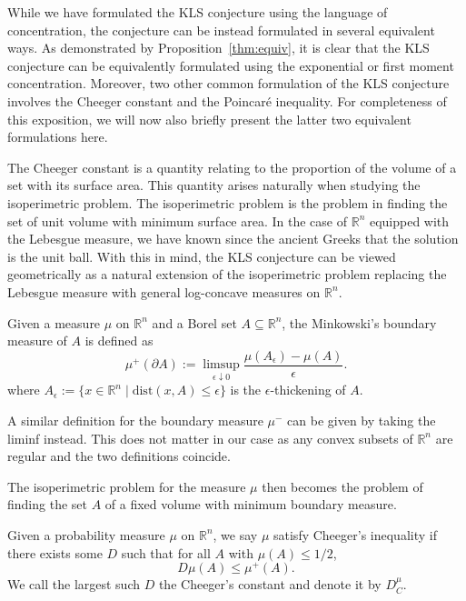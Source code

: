 While we have formulated the KLS conjecture using the language of concentration, the conjecture can be  
instead formulated in several equivalent ways. As demonstrated by Proposition~\ref{thm:equiv}, it is clear 
that the KLS conjecture can be equivalently formulated using the exponential or first moment concentration. 
Moreover, two other common formulation of the KLS conjecture involves the Cheeger constant and the Poincaré 
inequality. For completeness of this exposition, we will now also briefly present the latter two equivalent 
formulations here. 

The Cheeger constant is a quantity relating to the proportion of the volume of a set with its surface area.
This quantity arises naturally when studying the isoperimetric problem. The isoperimetric problem is the problem 
in finding the set of unit volume with minimum surface area. In the case of \(\mathbb{R}^n\) equipped with the 
Lebesgue measure, we have known since the ancient Greeks that the solution is the unit ball. 
With this in mind, the KLS conjecture can be viewed geometrically as a natural extension of the isoperimetric problem 
replacing the Lebesgue measure with general log-concave measures on \(\mathbb{R}^n\).

\begin{definition}
  Given a measure \(\mu\) on \(\mathbb{R}^n\) and a Borel set \(A \subseteq \mathbb{R}^n\), the Minkowski's 
  boundary measure of \(A\) is defined as
  \[\mu^+(\partial A) := \limsup_{\epsilon \downarrow 0} \frac{\mu(A_\epsilon) - \mu(A)}{\epsilon}.\]
  where \(A_\epsilon := \{x \in \mathbb{R}^n \mid \text{dist}(x, A) \le \epsilon\}\) is the 
  \(\epsilon\)-thickening of \(A\). 

  A similar definition for the boundary measure \(\mu^-\) can be given by taking the liminf instead. This 
  does not matter in our case as any convex subsets of \(\mathbb{R}^n\) are regular and the two definitions 
  coincide. 
\end{definition}

The isoperimetric problem for the measure \(\mu\) then becomes the problem of finding the set \(A\) 
of a fixed volume with minimum boundary measure. 

\begin{definition}
  Given a probability measure \(\mu\) on \(\mathbb{R}^n\), we say \(\mu\) satisfy Cheeger's inequality 
  if there exists some \(D\) such that for all \(A\) with \(\mu(A) \le 1 / 2\),
  \[D\mu(A) \le \mu^+(A).\]
  We call the largest such \(D\) the Cheeger's constant and denote it by \(D^\mu_C\).
\end{definition}

